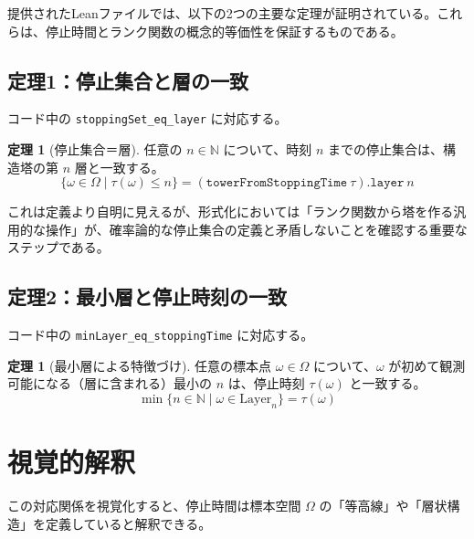 \documentclass[a4paper,11pt]{ltjsarticle}
\theoremstyle{definition}
\newtheorem{theorem}[definition]{定理}
\newcommand{\N}{\mathbb{N}}
\newcommand{\OmegaSpace}{\Omega}
\newcommand{\Layer}[1]{\mathrm{Layer}_{#1}}
\newcommand{\Tau}{\tau}
\newcommand{\code}[1]{\texttt{#1}}
\begin{document}
提供されたLeanファイルでは、以下の2つの主要な定理が証明されている。これらは、停止時間とランク関数の概念的等価性を保証するものである。

\subsection{定理1：停止集合と層の一致}
コード中の \code{stoppingSet\_eq\_layer} に対応する。

\begin{theorem}[停止集合＝層]
任意の $n \in \N$ について、時刻 $n$ までの停止集合は、構造塔の第 $n$ 層と一致する。
\[
    \{ \omega \in \OmegaSpace \mid \Tau(\omega) \le n \} = (\code{towerFromStoppingTime}\ \Tau).\code{layer}\ n
\]
\end{theorem}
これは定義より自明に見えるが、形式化においては「ランク関数から塔を作る汎用的な操作」が、確率論的な停止集合の定義と矛盾しないことを確認する重要なステップである。

\subsection{定理2：最小層と停止時刻の一致}
コード中の \code{minLayer\_eq\_stoppingTime} に対応する。

\begin{theorem}[最小層による特徴づけ]
任意の標本点 $\omega \in \OmegaSpace$ について、$\omega$ が初めて観測可能になる（層に含まれる）最小の $n$ は、停止時刻 $\Tau(\omega)$ と一致する。
\[
    \min \{ n \in \N \mid \omega \in \Layer{n} \} = \Tau(\omega)
\]
\end{theorem}

\section{視覚的解釈}

この対応関係を視覚化すると、停止時間は標本空間 $\OmegaSpace$ の「等高線」や「層状構造」を定義していると解釈できる。
\end{document}
